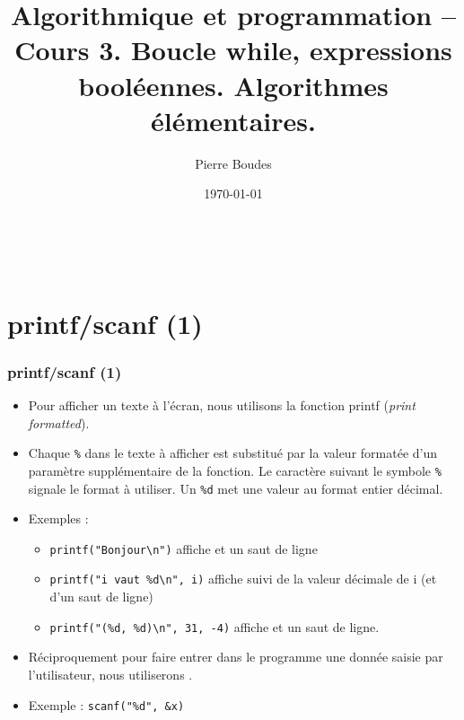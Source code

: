 \documentclass[xcolor=pdftex,svgnames,table]{beamer}
\title{Algorithmique et programmation -- Cours 3. Boucle while,
expressions booléennes. Algorithmes élémentaires.}
\author{Pierre Boudes}
\date{\today}
\begin{document}
\begin{frame}
	\titlepage
	\vfill
	\begin{center}
		\\[2.5ex]
		{\tiny\CcNote{\CcLongnameByNcSa}}
		\vspace*{-2.5ex}
	\end{center}
\end{frame}

\frame[label=plan]{\tableofcontents}

\section{printf/scanf (1)}
\begin{frame}[fragile]
  \frametitle{printf/scanf (1) \nowrite}
\begin{itemize}
\item  Pour afficher un texte à l'écran, nous utilisons la fonction \alert{printf}
  (\emph{print formatted}). 
\item Chaque \verb+%+ 
dans le texte à afficher est substitué par la valeur formatée d'un
\alert{paramètre supplémentaire} de la fonction. Le caractère suivant le
symbole \verb+%+ 
signale le format à utiliser.  Un \verb+%d+
met une valeur au format \alert{entier décimal}.
\pause
\item Exemples :
  \begin{itemize}
\item
    \verb+printf("Bonjour\n")+ 
affiche  et un saut de
    ligne\pause
\item
    \verb+printf("i vaut %d\n", i)+ 
affiche  suivi de la valeur décimale de i (et d'un saut de
ligne)\pause
\item
    \verb+printf("(%d, %d)\n", 31, -4)+ 
affiche  et un saut de ligne.
 \end{itemize}
\pause
\item Réciproquement pour faire entrer dans le programme une donnée saisie par
  l'utilisateur, nous utiliserons \alert{}.
\item Exemple : \verb+scanf("%d", &x)+
\end{itemize}
\end{frame}
\end{document}

